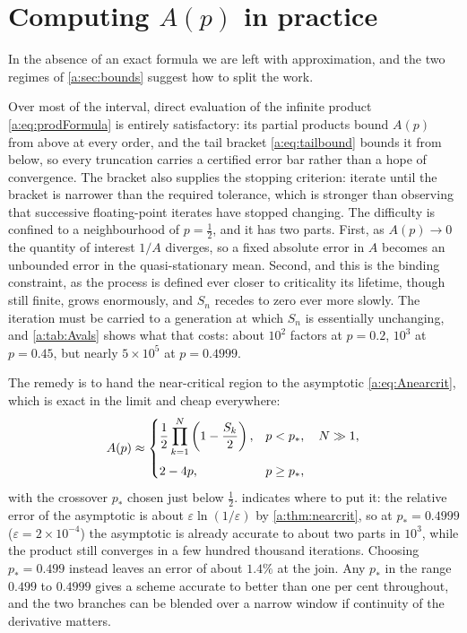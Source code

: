 \section{Computing \texorpdfstring{$A(p)$}{A(p)} in practice}
\label{a:sec:practical}

In the absence of an exact formula we are left with approximation, and the two
regimes of \cref{a:sec:bounds} suggest how to split the work.

Over most of the interval, direct evaluation of the infinite product
\cref{a:eq:prodFormula} is entirely satisfactory: its partial products bound
$A(p)$ from above at every order, and the tail bracket \cref{a:eq:tailbound}
bounds it from below, so every truncation carries a certified error bar rather
than a hope of convergence. The bracket also supplies the stopping criterion:
iterate until the bracket is narrower than the required tolerance, which is
stronger than observing that successive floating-point iterates have stopped
changing. The difficulty is confined to a neighbourhood of $p=\tfrac12$, and it
has two parts. First, as $A(p)\to0$ the quantity of interest $1/A$ diverges, so a
fixed absolute error in $A$ becomes an unbounded error in the quasi-stationary
mean. Second, and this is the binding constraint, as the process is defined ever
closer to criticality its lifetime, though still finite, grows enormously, and
$S_n$ recedes to zero ever more slowly. The iteration must be carried to a
generation at which $S_n$ is essentially unchanging, and \cref{a:tab:Avals} shows
what that costs: about $10^2$ factors at $p=0.2$, $10^3$ at $p=0.45$, but nearly
$5\times10^5$ at $p=0.4999$.

The remedy is to hand the near-critical region to the asymptotic
\cref{a:eq:Anearcrit}, which is exact in the limit and cheap everywhere:
\begin{equation}
\label{a:eq:Apractical}
A(p) \approx
\begin{cases}
\displaystyle \frac12\prod_{k=1}^{N}\left(1-\frac{S_k}{2}\right), & p<p_\ast,\quad N\gg1,\\[14pt]
2-4p, & p\ge p_\ast,
\end{cases}
\end{equation}
with the crossover $p_\ast$ chosen just below $\tfrac12$. 
indicates where to put it: the relative error of the asymptotic is about
$\varepsilon\ln(1/\varepsilon)$ by \cref{a:thm:nearcrit}, so at
$p_\ast = 0.4999$ ($\varepsilon = 2\times10^{-4}$) the asymptotic is already
accurate to about two parts in $10^3$, while the product still converges in a few
hundred thousand iterations. Choosing $p_\ast=0.499$ instead leaves an error of
about $1.4\%$ at the join. Any $p_\ast$ in the range $0.499$ to $0.4999$ gives a
scheme accurate to better than one per cent throughout, and the two branches can
be blended over a narrow window if continuity of the derivative matters.

